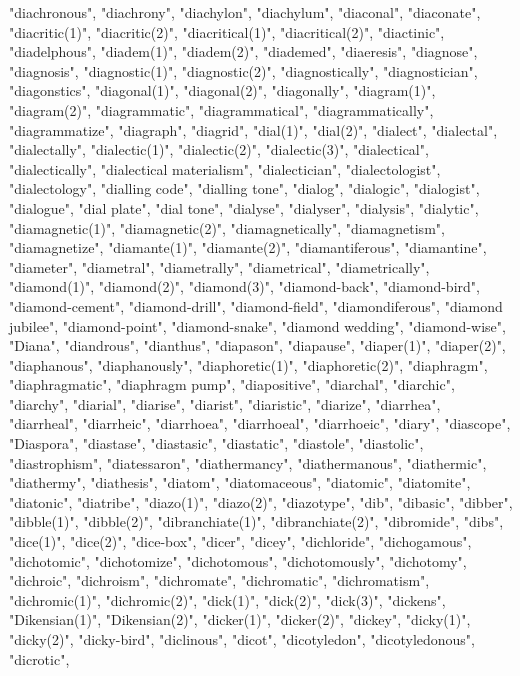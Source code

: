 "diachronous",
"diachrony",
"diachylon",
"diachylum",
"diaconal",
"diaconate",
"diacritic(1)",
"diacritic(2)",
"diacritical(1)",
"diacritical(2)",
"diactinic",
"diadelphous",
"diadem(1)",
"diadem(2)",
"diademed",
"diaeresis",
"diagnose",
"diagnosis",
"diagnostic(1)",
"diagnostic(2)",
"diagnostically",
"diagnostician",
"diagonstics",
"diagonal(1)",
"diagonal(2)",
"diagonally",
"diagram(1)",
"diagram(2)",
"diagrammatic",
"diagrammatical",
"diagrammatically",
"diagrammatize",
"diagraph",
"diagrid",
"dial(1)",
"dial(2)",
"dialect",
"dialectal",
"dialectally",
"dialectic(1)",
"dialectic(2)",
"dialectic(3)",
"dialectical",
"dialectically",
"dialectical materialism",
"dialectician",
"dialectologist",
"dialectology",
"dialling code",
"dialling tone",
"dialog",
"dialogic",
"dialogist",
"dialogue",
"dial plate",
"dial tone",
"dialyse",
"dialyser",
"dialysis",
"dialytic",
"diamagnetic(1)",
"diamagnetic(2)",
"diamagnetically",
"diamagnetism",
"diamagnetize",
"diamante(1)",
"diamante(2)",
"diamantiferous",
"diamantine",
"diameter",
"diametral",
"diametrally",
"diametrical",
"diametrically",
"diamond(1)",
"diamond(2)",
"diamond(3)",
"diamond-back",
"diamond-bird",
"diamond-cement",
"diamond-drill",
"diamond-field",
"diamondiferous",
"diamond jubilee",
"diamond-point",
"diamond-snake",
"diamond wedding",
"diamond-wise",
"Diana",
"diandrous",
"dianthus",
"diapason",
"diapause",
"diaper(1)",
"diaper(2)",
"diaphanous",
"diaphanously",
"diaphoretic(1)",
"diaphoretic(2)",
"diaphragm",
"diaphragmatic",
"diaphragm pump",
"diapositive",
"diarchal",
"diarchic",
"diarchy",
"diarial",
"diarise",
"diarist",
"diaristic",
"diarize",
"diarrhea",
"diarrheal",
"diarrheic",
"diarrhoea",
"diarrhoeal",
"diarrhoeic",
"diary",
"diascope",
"Diaspora",
"diastase",
"diastasic",
"diastatic",
"diastole",
"diastolic",
"diastrophism",
"diatessaron",
"diathermancy",
"diathermanous",
"diathermic",
"diathermy",
"diathesis",
"diatom",
"diatomaceous",
"diatomic",
"diatomite",
"diatonic",
"diatribe",
"diazo(1)",
"diazo(2)",
"diazotype",
"dib",
"dibasic",
"dibber",
"dibble(1)",
"dibble(2)",
"dibranchiate(1)",
"dibranchiate(2)",
"dibromide",
"dibs",
"dice(1)",
"dice(2)",
"dice-box",
"dicer",
"dicey",
"dichloride",
"dichogamous",
"dichotomic",
"dichotomize",
"dichotomous",
"dichotomously",
"dichotomy",
"dichroic",
"dichroism",
"dichromate",
"dichromatic",
"dichromatism",
"dichromic(1)",
"dichromic(2)",
"dick(1)",
"dick(2)",
"dick(3)",
"dickens",
"Dikensian(1)",
"Dikensian(2)",
"dicker(1)",
"dicker(2)",
"dickey",
"dicky(1)",
"dicky(2)",
"dicky-bird",
"diclinous",
"dicot",
"dicotyledon",
"dicotyledonous",
"dicrotic",
